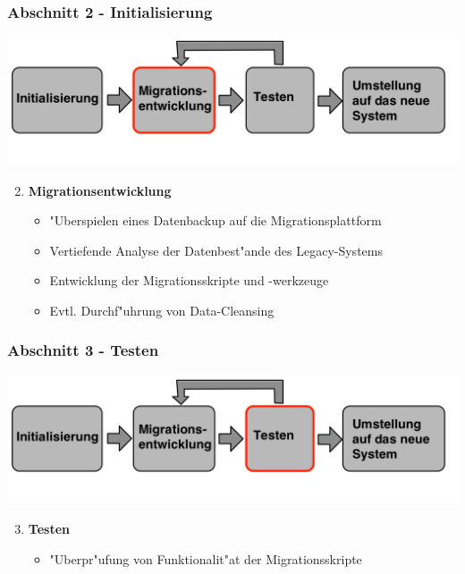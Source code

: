 \documentclass{beamer}
\begin{document}
	\begin{frame}
		\frametitle{Abschnitt 2 - Initialisierung}
		
		\centering
		\includegraphics[width=\textwidth]{../images/prozessmodell2t.png}\\
		
		\begin{enumerate}
			\setcounter{enumi}{1}
			
			\item \textbf{Migrationsentwicklung}
			\begin{itemize}
				\item "Uberspielen eines Datenbackup auf die Migrationsplattform
				\item Vertiefende Analyse der Datenbest"ande des Legacy-Systems
				\item Entwicklung der Migrationsskripte und -werkzeuge
				\item Evtl. Durchf"uhrung von Data-Cleansing
			\end{itemize}
			
		\end{enumerate}
	\end{frame}
	
	\begin{frame}
		\frametitle{Abschnitt 3 - Testen}
		
		\centering
		\includegraphics[width=\textwidth]{../images/prozessmodell3t.png}\\
		
		\begin{enumerate}
			\setcounter{enumi}{2}
			
			\item \textbf{Testen}
			\begin{itemize}
				\item "Uberpr"ufung von Funktionalit"at der Migrationsskripte
			\end{itemize}
			
		\end{enumerate}
	\end{frame}
	
\end{document}
